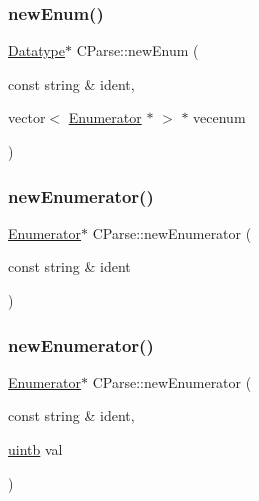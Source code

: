 \mbox{\label{class_c_parse_a6ee2dc779cf7d45596f96d143d908c87}} 
\subsubsection{\texorpdfstring{newEnum()}{newEnum()}}
{\footnotesize\ttfamily \mbox{\hyperlink{class_datatype}{Datatype}}$\ast$ C\+Parse\+::new\+Enum (\begin{DoxyParamCaption}\item[{const string \&}]{ident,  }\item[{vector$<$ \mbox{\hyperlink{struct_enumerator}{Enumerator}} $\ast$ $>$ $\ast$}]{vecenum }\end{DoxyParamCaption})}

\mbox{\label{class_c_parse_a41b3e38981d834661c185d4c16787934}} 
\subsubsection{\texorpdfstring{newEnumerator()}{newEnumerator()}\hspace{0.1cm}{\footnotesize\ttfamily [1/2]}}
{\footnotesize\ttfamily \mbox{\hyperlink{struct_enumerator}{Enumerator}}$\ast$ C\+Parse\+::new\+Enumerator (\begin{DoxyParamCaption}\item[{const string \&}]{ident }\end{DoxyParamCaption})}

\mbox{\label{class_c_parse_a760db39f4211537b3471c7f6f614b8ac}} 
\subsubsection{\texorpdfstring{newEnumerator()}{newEnumerator()}\hspace{0.1cm}{\footnotesize\ttfamily [2/2]}}
{\footnotesize\ttfamily \mbox{\hyperlink{struct_enumerator}{Enumerator}}$\ast$ C\+Parse\+::new\+Enumerator (\begin{DoxyParamCaption}\item[{const string \&}]{ident,  }\item[{\mbox{\hyperlink{types_8h_a2db313c5d32a12b01d26ac9b3bca178f}{uintb}}}]{val }\end{DoxyParamCaption})}

